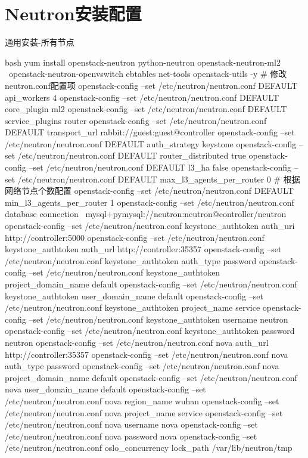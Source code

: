 \section{Neutron安装配置}
\begin{outline}[enumerate]

\1 通用安装-所有节点
\begin{code-block}{bash}
yum install openstack-neutron python-neutron openstack-neutron-ml2 \
    openstack-neutron-openvswitch ebtables net-tools openstack-utils  -y
# 修改neutron.conf配置项
openstack-config --set /etc/neutron/neutron.conf DEFAULT api_workers 4
openstack-config --set /etc/neutron/neutron.conf DEFAULT core_plugin ml2
openstack-config --set /etc/neutron/neutron.conf DEFAULT service_plugins router
openstack-config --set /etc/neutron/neutron.conf DEFAULT transport_url rabbit://guest:guest@controller
openstack-config --set /etc/neutron/neutron.conf DEFAULT auth_strategy keystone
openstack-config --set /etc/neutron/neutron.conf DEFAULT router_distributed true
openstack-config --set /etc/neutron/neutron.conf DEFAULT l3_ha false
openstack-config --set /etc/neutron/neutron.conf DEFAULT max_l3_agents_per_router 0
# 根据网络节点个数配置
openstack-config --set /etc/neutron/neutron.conf DEFAULT min_l3_agents_per_router 1
openstack-config --set /etc/neutron/neutron.conf database connection \
    mysql+pymysql://neutron:neutron@controller/neutron
openstack-config --set /etc/neutron/neutron.conf keystone_authtoken auth_uri http://controller:5000
openstack-config --set /etc/neutron/neutron.conf keystone_authtoken auth_url http://controller:35357
openstack-config --set /etc/neutron/neutron.conf keystone_authtoken auth_type password
openstack-config --set /etc/neutron/neutron.conf keystone_authtoken project_domain_name default
openstack-config --set /etc/neutron/neutron.conf keystone_authtoken user_domain_name default
openstack-config --set /etc/neutron/neutron.conf keystone_authtoken project_name service
openstack-config --set /etc/neutron/neutron.conf keystone_authtoken username neutron
openstack-config --set /etc/neutron/neutron.conf keystone_authtoken password neutron
openstack-config --set /etc/neutron/neutron.conf nova auth_url http://controller:35357
openstack-config --set /etc/neutron/neutron.conf nova auth_type password
openstack-config --set /etc/neutron/neutron.conf nova project_domain_name default
openstack-config --set /etc/neutron/neutron.conf nova user_domain_name default
openstack-config --set /etc/neutron/neutron.conf nova region_name wuhan
openstack-config --set /etc/neutron/neutron.conf nova project_name service
openstack-config --set /etc/neutron/neutron.conf nova username nova
openstack-config --set /etc/neutron/neutron.conf nova password nova
openstack-config --set /etc/neutron/neutron.conf oslo_concurrency lock_path /var/lib/neutron/tmp


\end{code-block}
\end{outline}
